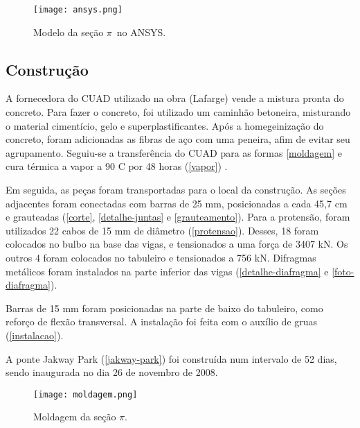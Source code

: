 \begin{figure}[htb]
	\caption{\label{ansys}Modelo da seção $ \pi $~no ANSYS.}
	\begin{center}
		\texttt{[image: ansys.png]}
	\end{center}
\end{figure}

\subsection{Construção}

A fornecedora do CUAD utilizado na obra (Lafarge) vende a mistura pronta do concreto. Para fazer o concreto, foi utilizado um caminhão betoneira, misturando o material cimentício, gelo e superplastificantes. Após a homegeinização do concreto, foram adicionadas as fibras de aço com uma peneira, afim de evitar seu agrupamento. Seguiu-se a transferência do CUAD para as formas \autoref{moldagem} e cura térmica a vapor a 90 \textsuperscript{\degree}C por 48 horas (\autoref{vapor}) \cite[p.~17]{Rouse}.


Em seguida, as peças foram transportadas para o local da construção. As seções adjacentes foram conectadas com barras de 25 mm, posicionadas a cada 45,7 cm e grauteadas (\autoref{corte}, \autoref{detalhe-juntas}  e \autoref{grauteamento}). Para a protensão, foram utilizados 22 cabos de 15 mm de diâmetro (\autoref{protensao}). Desses, 18 foram colocados no bulbo na base das vigas, e tensionados a uma força de 3407 kN. Os outros 4 foram colocados no tabuleiro e tensionados a 756 kN. Difragmas metálicos foram instalados na parte inferior das vigas (\autoref{detalhe-diafragma} e \autoref{foto-diafragma}).

Barras de 15 mm foram posicionadas na parte de baixo do tabuleiro, como reforço de flexão transversal. A instalação foi feita com o auxílio de gruas (\autoref{instalacao}).

A ponte Jakway Park (\autoref{jakway-park}) foi construída num intervalo de 52 dias, sendo inaugurada no dia 26 de novembro de 2008.

\begin{figure}[htb]
	\caption{\label{moldagem}Moldagem da seção $ \pi $.}
	\begin{center}
		\texttt{[image: moldagem.png]}
	\end{center}
\end{figure}


